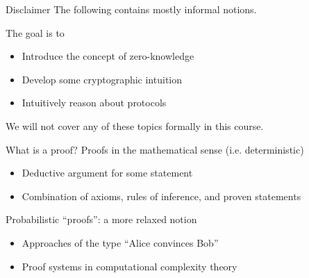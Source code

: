 \begin{frame}{Disclaimer}
  \pause
  The following contains mostly informal notions.

  \pause
  The goal is to
  \begin{itemize}[<+(1)->]
    \item Introduce the concept of zero-knowledge
    \item Develop some cryptographic intuition
    \item Intuitively reason about protocols
  \end{itemize}

  \vfill

  \pause
  We will not cover any of these topics formally in this course.
\end{frame}

\begin{frame}{What is a proof?}
  \pause
  Proofs in the mathematical sense (i.e. deterministic)
  \begin{itemize}[<+(1)->]
    \item Deductive argument for some statement
    \item Combination of axioms, rules of inference, and proven statements
  \end{itemize}

  \vspace*{1em}

  \pause
  Probabilistic \enquote{proofs}: a more relaxed notion
  \begin{itemize}[<+(1)->]
    \item Approaches of the type \enquote{Alice convinces Bob}
    \item Proof systems in computational complexity theory
  \end{itemize}
\end{frame}

